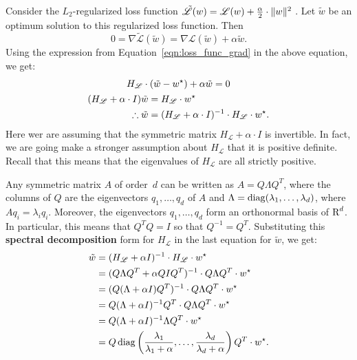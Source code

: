 Consider the $L_2$-regularized loss function 
$\tilde{\mathscr{L}}(w) = \mathscr{L}(w) + \frac{\alpha}{2} \cdot \lVert w\rVert^2$ .
Let $\tilde{w}$ be an optimum solution to this regularized loss function. Then 
\begin{equation}
\label{eqn:reg_loss_func_grad}
    0 = \nabla \tilde{\mathscr{L}}(\tilde{w}) = 
        \nabla \mathscr{L}(\tilde{w}) 
        + \alpha \tilde{w}.
\end{equation}
Using the expression from Equation~\ref{eqn:loss_func_grad} in the above equation, 
we get:
\begin{gather}
H_{\mathscr{L}} \cdot (\tilde{w} - w^{\star}) + \alpha \tilde{w} = 0 \notag \\
\begin{split}
(H_{\mathscr{L}} + \alpha \cdot I) \tilde{w} & = H_{\mathscr{L}} \cdot w^{\star} \\
\therefore \tilde{w} & = (H_{\mathscr{L}} + \alpha \cdot I)^{-1} \cdot H_{\mathscr{L}} \cdot w^{\star}.
\end{split}
\end{gather}
Here wer are assuming that the symmetric matrix $H_{\mathscr{L}} + \alpha \cdot I$
is invertible. In fact, we are going make a stronger assumption about $H_{\mathscr{L}}$
that it is positive definite. Recall that this means that the eigenvalues of 
$H_{\mathscr{L}}$ are all strictly positive. 

Any symmetric matrix $A$ of order~$d$ can be written as $A = Q \Lambda Q^{T}$, 
where the columns of $Q$ are the eigenvectors $q_1, \ldots, q_d$ of $A$ and 
$\Lambda = \operatorname{diag}(\lambda_1, \ldots, \lambda_d)$, where $A q_i = \lambda_i q_i$.
Moreover, the eigenvectors $q_1, \ldots, q_d$ form an orthonormal basis of $\text{R}^{d}$. 
In particular, this means that $Q^{T}Q = I$ so that $Q^{-1} = Q^{T}$. Substituting 
this \textbf{spectral decomposition} form for $H_{\mathscr{L}}$ in the last 
equation for $\tilde{w}$, we get:
\begin{align}
    \label{eqn:optimal_regularized_solution}
    \tilde{w} 
        & = (H_{\mathscr{L}} + \alpha I)^{-1} \cdot H_{\mathscr{L}} \cdot w^{\star} \nonumber \\ 
        & = (Q \Lambda Q^{T} + \alpha Q I Q^{T})^{-1} \cdot Q \Lambda Q^{T} \cdot w^{\star} \nonumber \\
        & = (Q (\Lambda + \alpha I )Q^{T})^{-1} \cdot Q \Lambda Q^{T} \cdot w^{\star} \nonumber \\
        & = Q (\Lambda + \alpha I)^{-1} Q^{T} \cdot Q \Lambda Q^{T} \cdot w^{\star} \nonumber \\
        & = Q (\Lambda + \alpha I)^{-1} \Lambda Q^{T} \cdot w^{\star} \nonumber \\
        & = Q 
            \operatorname{diag} \left ( \frac{\lambda_1}{\lambda_1 + \alpha}, \ldots, \frac{\lambda_d}{\lambda_d + \alpha} \right ) 
            Q^{T} \cdot w^{\star}.
\end{align} 


